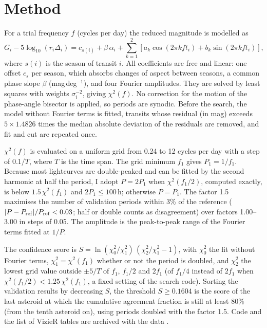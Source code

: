 \documentclass[RNAAS]{aastex631}
\begin{document}
\section{Method}

For a trial frequency $f$ (cycles per day) the reduced magnitude is modelled as
\begin{equation}
G_i-5\log_{10}(r_i\Delta_i)=c_{s(i)}+\beta\,\alpha_i+\sum_{k=1}^{2}\left[a_k\cos(2\pi k f t_i)+b_k\sin(2\pi k f t_i)\right],
\end{equation}
where $s(i)$ is the season of transit $i$. All coefficients are free and linear: one offset $c_s$ per
season, which absorbs changes of aspect between seasons, a common phase slope $\beta$ (mag\,deg$^{-1}$),
and four Fourier amplitudes. They are solved by least squares with weights $\sigma_i^{-2}$, giving
$\chi^2(f)$. No correction for the motion of the phase-angle bisector is applied, so periods are
synodic. Before the search, the model without Fourier terms is fitted, transits whose residual (in mag) exceeds
$5\times1.4826$ times the median absolute deviation of the residuals are removed, and fit and cut are
repeated once.

$\chi^2(f)$ is evaluated on a uniform grid from 0.24 to 12 cycles per day with a step of $0.1/T$, where $T$
is the time span. The grid minimum $f_1$ gives $P_1=1/f_1$. Because most lightcurves are double-peaked and
can be fitted by the second harmonic at half the period, I adopt $P=2P_1$ when $\chi^2(f_1/2)$, computed
exactly, is below $1.5\,\chi^2(f_1)$ and $2P_1\le100$\,h; otherwise $P=P_1$. The factor 1.5 maximises the
number of validation periods within 3\% of the reference ($|P-P_{\rm ref}|/P_{\rm ref}<0.03$; half or double
counts as disagreement) over factors 1.00--3.00 in steps of 0.05. The amplitude is the peak-to-peak range of
the Fourier terms fitted at $1/P$.

The confidence score is $S=\ln(\chi^2_0/\chi^2_1)\,(\chi^2_2/\chi^2_1-1)$, with $\chi^2_0$ the fit without
Fourier terms, $\chi^2_1=\chi^2(f_1)$ whether or not the period is doubled, and $\chi^2_2$ the lowest grid
value outside $\pm5/T$ of $f_1$, $f_1/2$ and $2f_1$ (of $f_1/4$ instead of $2f_1$ when
$\chi^2(f_1/2)<1.25\,\chi^2(f_1)$, a fixed setting of the search code). Sorting the validation results by decreasing $S$, the threshold
$S\ge0.1604$ is the score of the last asteroid at which the cumulative agreement fraction is still at
least 80\% (from the tenth asteroid on), using periods doubled with the factor 1.5. Code and the list of VizieR tables are archived with the data
\citep{Tropynin2026}.
\end{document}
